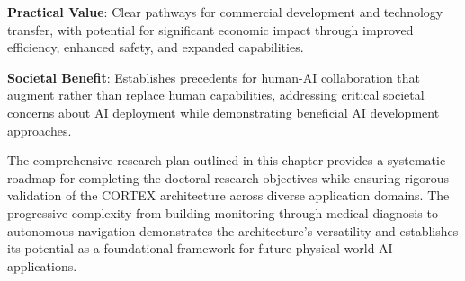 \textbf{Practical Value}: Clear pathways for commercial development and technology transfer, with potential for significant economic impact through improved efficiency, enhanced safety, and expanded capabilities.

\textbf{Societal Benefit}: Establishes precedents for human-AI collaboration that augment rather than replace human capabilities, addressing critical societal concerns about AI deployment while demonstrating beneficial AI development approaches.

The comprehensive research plan outlined in this chapter provides a systematic roadmap for completing the doctoral research objectives while ensuring rigorous validation of the CORTEX architecture across diverse application domains. The progressive complexity from building monitoring through medical diagnosis to autonomous navigation demonstrates the architecture's versatility and establishes its potential as a foundational framework for future physical world AI applications.